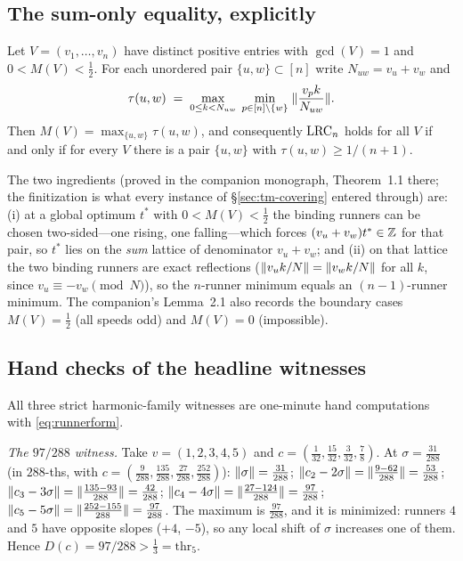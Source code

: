 \subsection{The sum-only equality, explicitly}

\begin{theorem}\label{thm:equality-explicit}
Let $V=(v_1,\dots,v_n)$ have distinct positive entries with $\gcd(V)=1$
and $0<M(V)<\tfrac12$. For each unordered pair $\{u,w\}\subset[n]$ write
$N_{uw}=v_u+v_w$ and
\[
\tau(u,w)\;=\;\max_{0\le k<N_{uw}}\;\min_{p\in[n]\setminus\{w\}}\;
\lVert \frac{v_pk}{N_{uw}} \rVert.
\]
Then $M(V)=\max_{\{u,w\}}\tau(u,w)$, and consequently $\mathrm{LRC}_n$ holds
for all $V$ if and only if for every $V$ there is a pair $\{u,w\}$ with
$\tau(u,w)\ge 1/(n+1)$.
\end{theorem}

The two ingredients (proved in the companion monograph, Theorem~1.1
there; the finitization is what every instance of \S\ref{sec:tm-covering}
entered through) are: (i) at a global optimum $t^\ast$ with
$0<M(V)<\tfrac12$ the binding runners can be chosen two-sided---one
rising, one falling---which forces $(v_u+v_w)t^\ast\in\mathbb{Z}$ for that pair,
so $t^\ast$ lies on the \emph{sum} lattice of denominator $v_u+v_w$; and
(ii) on that lattice the two binding runners are exact reflections
($\lVert v_uk/N \rVert=\lVert v_wk/N \rVert$ for all $k$, since $v_u\equiv-v_w \pmod N$),
so the $n$-runner minimum equals an $(n-1)$-runner minimum. The
companion's Lemma~2.1 also records the boundary cases $M(V)=\tfrac12$
(all speeds odd) and $M(V)=0$ (impossible).

\subsection{Hand checks of the headline witnesses}

All three strict harmonic-family witnesses are one-minute hand
computations with \eqref{eq:runnerform}.

\emph{The $97/288$ witness.} Take $v=(1,2,3,4,5)$ and
$c=(\tfrac1{32},\tfrac{15}{32},\tfrac3{32},\tfrac78)$. At
$\sigma=\tfrac{31}{288}$ (in $288$-ths, with $c=(\tfrac9{288},
\tfrac{135}{288},\tfrac{27}{288},\tfrac{252}{288})$):
$\lVert \sigma \rVert=\tfrac{31}{288}$;
$\lVert c_2-2\sigma \rVert=\lVert \tfrac{9-62}{288} \rVert=\tfrac{53}{288}$;
$\lVert c_3-3\sigma \rVert=\lVert \tfrac{135-93}{288} \rVert=\tfrac{42}{288}$;
$\lVert c_4-4\sigma \rVert=\lVert \tfrac{27-124}{288} \rVert=\tfrac{97}{288}$;
$\lVert c_5-5\sigma \rVert=\lVert \tfrac{252-155}{288} \rVert=\tfrac{97}{288}$.
The maximum is $\tfrac{97}{288}$, and it is minimized: runners $4$ and
$5$ have opposite slopes ($+4$, $-5$), so any local shift of $\sigma$
increases one of them. Hence $D(c)=97/288>\tfrac13=\mathrm{thr}_5$.


